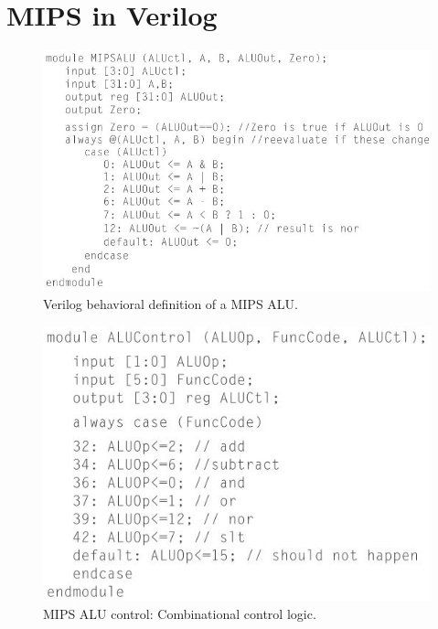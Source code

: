\documentclass[10pt,a4paper]{article}
\begin{document}
\pagebreak

\section{MIPS in Verilog}

\begin{figure} [h!]
    \centering
    \includegraphics[scale=0.7]{ALU verilog.JPG}
    \caption{Verilog behavioral deﬁnition of a MIPS ALU.}
\end{figure}

\begin{figure} [h!]
    \centering
    \includegraphics[scale=0.7]{ALU control verilog.JPG}
    \caption{MIPS ALU control: Combinational control logic.}
\end{figure}


\end{document}

